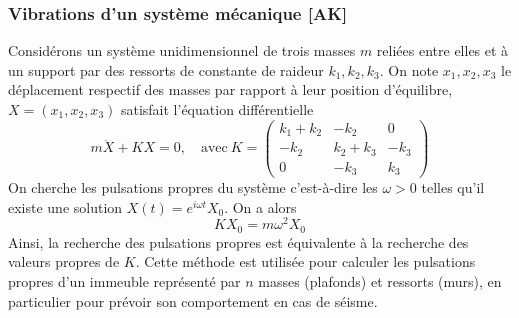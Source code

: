 \subsubsection{Vibrations d'un système mécanique [AK]}
\begin{center}
\end{center}
Considérons un système unidimensionnel de trois masses $m$ reliées entre elles et à un support par des ressorts de constante de raideur $k_1,k_2,k_3$. On note $x_1, x_2,x_3$ le déplacement respectif des masses par rapport à leur position d'équilibre, $X = (x_1,x_2,x_3)$ satisfait l'équation différentielle
\begin{displaymath}
m \ddot X + K X = 0, \quad \textrm{avec} \ K = \left(\begin{array}{ccc}
k_1 + k_2 & -k_2 & 0 \\
-k_2 & k_2 + k_3 & -k_3 \\
0 & -k_3 & k_3
\end{array}\right)
\end{displaymath}
On cherche les pulsations propres du système c'est-à-dire les $\omega > 0$ telles qu'il existe une solution $X(t) = e^{i\omega t}X_0$. On a alors
\begin{displaymath}
K X_0 = m \omega^2 X_0
\end{displaymath}
Ainsi, la recherche des pulsations propres est équivalente à la recherche des valeurs propres de $K$. Cette méthode est utilisée pour calculer les pulsations propres d'un immeuble représenté par $n$ masses (plafonds) et ressorts (murs), en particulier pour prévoir son comportement en cas de séisme.




